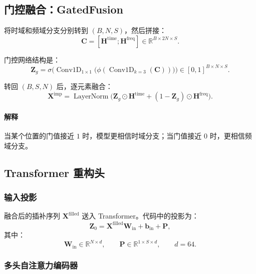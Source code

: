 \documentclass[UTF8]{ctexart}
\begin{document}
\subsection{门控融合：GatedFusion}

将时域和频域分支分别转到 $(B,N,S)$，然后拼接：
\begin{equation}
    \bm{C} = [\bm{H}^{\text{time}};\bm{H}^{\text{freq}}] \in \mathbb{R}^{B \times 2N \times S}.
\end{equation}

门控网络结构是：
\begin{equation}
    \bm{Z}_g
    =
    \sigma\!\Big(
        \operatorname{Conv1D}_{1\times 1}
        \big(
            \phi(\operatorname{Conv1D}_{k=3}(\bm{C}))
        \big)
    \Big)
    \in [0,1]^{B \times N \times S}.
\end{equation}

转回 $(B,S,N)$ 后，逐元素融合：
\begin{equation}
    \bm{X}^{\text{imp}}
    =
    \operatorname{LayerNorm}
    \big(
        \bm{Z}_g \odot \bm{H}^{\text{time}}
        +
        (1-\bm{Z}_g)\odot \bm{H}^{\text{freq}}
    \big).
\end{equation}

\paragraph{解释}
当某个位置的门值接近 $1$ 时，模型更相信时域分支；当门值接近 $0$ 时，更相信频域分支。

\subsection{Transformer 重构头}

\subsubsection{输入投影}

融合后的插补序列 $\bm{X}^{\text{filled}}$ 送入 Transformer。代码中的投影为：
\begin{equation}
    \bm{Z}_0 = \bm{X}^{\text{filled}}\bm{W}_{\text{in}} + \bm{b}_{\text{in}} + \bm{P},
\end{equation}
其中：
\begin{equation}
    \bm{W}_{\text{in}} \in \mathbb{R}^{N \times d}, \qquad
    \bm{P} \in \mathbb{R}^{1 \times S \times d}, \qquad d=64.
\end{equation}

\subsubsection{多头自注意力编码器}
\end{document}
